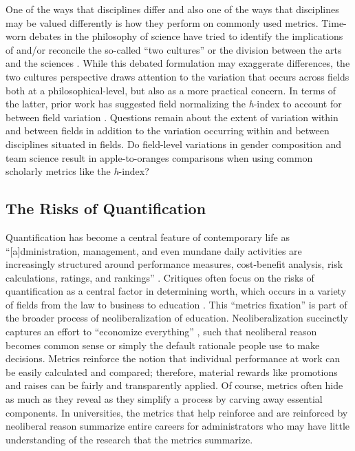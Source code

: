 \documentclass[
  10pt,
  letterpaper,
]{article}
\begin{document}
One of the ways that disciplines differ and also one of the ways that
disciplines may be valued differently is how they perform on commonly
used metrics. Time-worn debates in the philosophy of science have tried
to identify the implications of and/or reconcile the so-called ``two
cultures'' or the division between the arts and the sciences
\citep{snow_two_2012}. While this debated formulation may exaggerate
differences, the two cultures perspective draws attention to the
variation that occurs across fields both at a philosophical-level, but
also as a more practical concern. In terms of the latter, prior work has
suggested field normalizing the \emph{h}-index to account for between
field variation \citep{bi_four_2023}. Questions remain about the extent
of variation within and between fields in addition to the variation
occurring within and between disciplines situated in fields. Do
field-level variations in gender composition and team science result in
apple-to-oranges comparisons when using common scholarly metrics like
the \emph{h}-index?

\subsection{The Risks of
Quantification}\label{the-risks-of-quantification}

Quantification has become a central feature of contemporary life as
``{[}a{]}dministration, management, and even mundane daily activities
are increasingly structured around performance measures, cost-benefit
analysis, risk calculations, ratings, and rankings''
\citep[p.~224]{mennicken_what_2019}. Critiques often focus on the risks
of quantification as a central factor in determining worth, which occurs
in a variety of fields from the law to business to education
\citep[p.~4]{muller_tyranny_2019}. This ``metrics fixation'' is part of
the broader process of neoliberalization of education. Neoliberalization
succinctly captures an effort to ``economize everything''
\citep[p.~171]{berg_producing_2016}, such that neoliberal reason becomes
common sense or simply the default rationale people use to make
decisions. Metrics reinforce the notion that individual performance at
work can be easily calculated and compared; therefore, material rewards
like promotions and raises can be fairly and transparently applied. Of
course, metrics often hide as much as they reveal as they simplify a
process by carving away essential components. In universities, the
metrics that help reinforce and are reinforced by neoliberal reason
summarize entire careers for administrators who may have little
understanding of the research that the metrics summarize.
\end{document}
